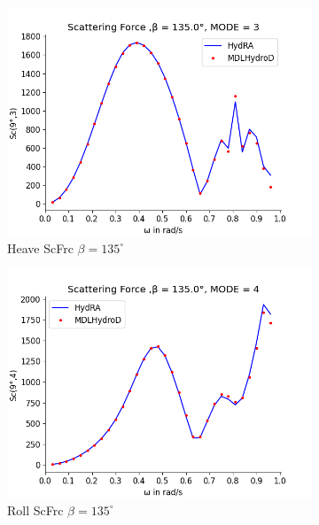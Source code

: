 \begin{figure}[H]
    \vspace{5pt}%
    \begin{subfigure}[b]{0.49\textwidth}
        \includegraphics[width=\textwidth]{plots/kcs/sc/sc3.png}
        \caption{Heave ScFrc $\beta = 135^{\circ}$}
    \end{subfigure}
    \begin{subfigure}[b]{0.49\textwidth}
        \includegraphics[width=\textwidth]{plots/kcs/sc/sc4.png}
        \caption{Roll ScFrc $\beta = 135^{\circ}$}
    \end{subfigure}
    \vspace{5pt}%
    \begin{subfigure}[b]{0.49\textwidth}

\end{subfigure}
\end{figure}

